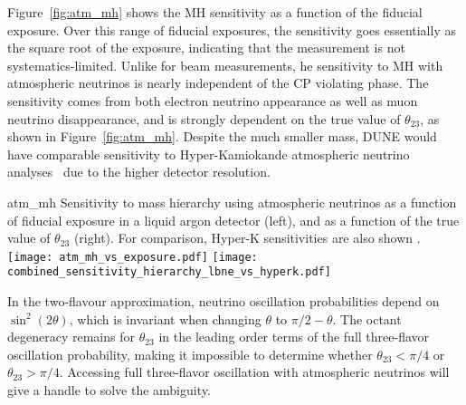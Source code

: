 
Figure~\ref{fig:atm_mh} shows the MH sensitivity as a function of the fiducial exposure. 
Over this range of fiducial exposures, the sensitivity goes essentially as the square 
root of the exposure, indicating that the measurement is not systematics-limited. 
Unlike for beam measurements, he sensitivity to MH with atmospheric neutrinos is 
nearly independent of the CP violating phase.  The sensitivity comes from both 
electron neutrino appearance as well as muon neutrino disappearance, and is strongly 
dependent on the true value of $\theta_{23}$, as shown in Figure~\ref{fig:atm_mh}.  Despite the
much smaller mass, DUNE would have comparable sensitivity to Hyper-Kamiokande atmospheric 
neutrino analyses~\cite{Kearns:2013lea} due to the higher detector resolution.    

\begin{cdrfigure}{atm_mh}
{Sensitivity to mass hierarchy using atmospheric neutrinos as a function of fiducial 
exposure in a liquid argon detector (left), and as a function of the true value of 
$\theta_{23}$ (right).  For comparison, Hyper-K sensitivities are also shown \cite{Kearns:2013lea}.}  
\texttt{[image: atm\_mh\_vs\_exposure.pdf]}
\texttt{[image: combined\_sensitivity\_hierarchy\_lbne\_vs\_hyperk.pdf]}
\end{cdrfigure}

In the two-flavour approximation, neutrino oscillation probabilities depend on 
$\sin^2(2\theta)$, which is invariant when changing $\theta$ to $\pi/2-\theta$. The octant 
degeneracy remains for $\theta_{23}$ in the leading order terms of the full 
three-flavor oscillation probability, making it impossible to determine whether $\theta_{23}< \pi/4$ or 
$\theta_{23}> \pi/4$. Accessing full three-flavor oscillation with atmospheric neutrinos 
will give a handle to solve the ambiguity.

